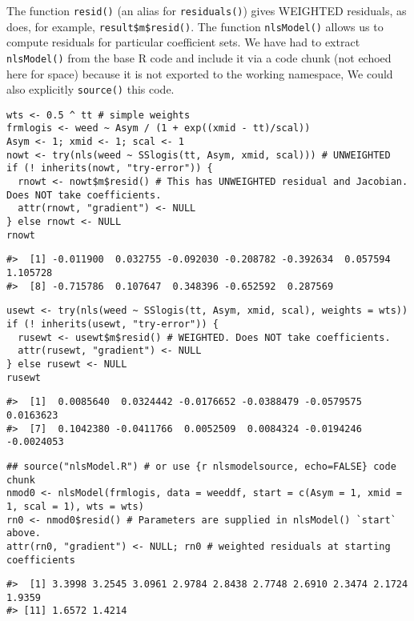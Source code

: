 The function \texttt{resid()} (an alias for \texttt{residuals()}) gives WEIGHTED residuals,
as does, for example, \texttt{result\$m\$resid()}. The function \texttt{nlsModel()}
allows us to compute residuals for particular coefficient sets.
We have had to extract \texttt{nlsModel()} from the base R code and include it via a code chunk
(not echoed here for space) because it is not exported to the working namespace,
We could also explicitly \texttt{source()} this code.

\begin{verbatim}
wts <- 0.5 ^ tt # simple weights
frmlogis <- weed ~ Asym / (1 + exp((xmid - tt)/scal))
Asym <- 1; xmid <- 1; scal <- 1
nowt <- try(nls(weed ~ SSlogis(tt, Asym, xmid, scal))) # UNWEIGHTED
if (! inherits(nowt, "try-error")) {
  rnowt <- nowt$m$resid() # This has UNWEIGHTED residual and Jacobian. Does NOT take coefficients.
  attr(rnowt, "gradient") <- NULL 
} else rnowt <- NULL
rnowt
\end{verbatim}

\begin{verbatim}
#>  [1] -0.011900  0.032755 -0.092030 -0.208782 -0.392634  0.057594  1.105728
#>  [8] -0.715786  0.107647  0.348396 -0.652592  0.287569
\end{verbatim}

\begin{verbatim}
usewt <- try(nls(weed ~ SSlogis(tt, Asym, xmid, scal), weights = wts))
if (! inherits(usewt, "try-error")) {
  rusewt <- usewt$m$resid() # WEIGHTED. Does NOT take coefficients.
  attr(rusewt, "gradient") <- NULL
} else rusewt <- NULL
rusewt
\end{verbatim}

\begin{verbatim}
#>  [1]  0.0085640  0.0324442 -0.0176652 -0.0388479 -0.0579575  0.0163623
#>  [7]  0.1042380 -0.0411766  0.0052509  0.0084324 -0.0194246 -0.0024053
\end{verbatim}

\begin{verbatim}
## source("nlsModel.R") # or use {r nlsmodelsource, echo=FALSE} code chunk
nmod0 <- nlsModel(frmlogis, data = weeddf, start = c(Asym = 1, xmid = 1, scal = 1), wts = wts)
rn0 <- nmod0$resid() # Parameters are supplied in nlsModel() `start` above.
attr(rn0, "gradient") <- NULL; rn0 # weighted residuals at starting coefficients
\end{verbatim}

\begin{verbatim}
#>  [1] 3.3998 3.2545 3.0961 2.9784 2.8438 2.7748 2.6910 2.3474 2.1724 1.9359
#> [11] 1.6572 1.4214
\end{verbatim}

